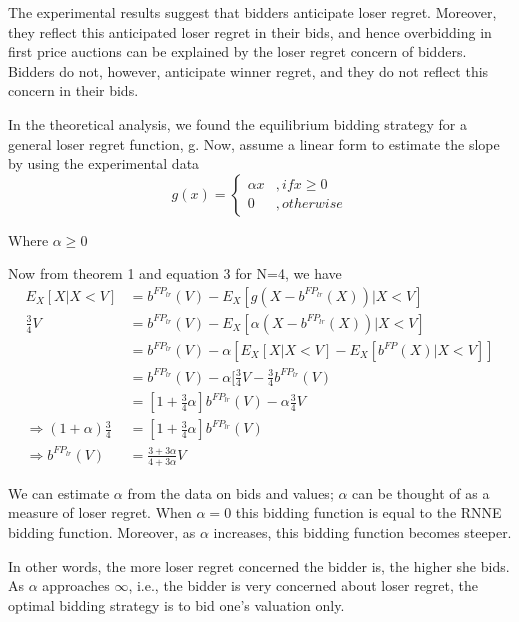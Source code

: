 \documentclass[10pt,a4paper,oneside]{report}
\begin{document}
\noindent The experimental results suggest that bidders anticipate loser regret. Moreover, they reflect this anticipated loser regret in their bids, and hence overbidding in first price auctions can be explained by the loser regret concern of bidders. Bidders do not, however, anticipate winner regret, and they do not reflect this concern in their bids.

\noindent In the theoretical analysis, we found the equilibrium bidding strategy for a general loser regret function, g. Now, assume a linear form to estimate the slope by using the experimental data\citep{bell1982regret}
\begin{equation}
g(x)=
\begin{cases}
\alpha x &,if x\geq 0 
\\
0 &, otherwise
\end{cases}
\end{equation}
\begin{flushleft}
Where $\alpha \geq 0$
\end{flushleft}

Now from theorem 1 and equation 3 for N=4, we have
\begin{align}
\nonumber
E_X[X|X<V] &= b^{{FP}_{lr}}(V)- E_X[g(X-b^{{FP}_{lr}}(X))|X<V]\\
\nonumber
\frac{3}{4}{V} &= b^{{FP}_{lr}}(V)-E_X[\alpha(X-b^{{FP}_{lr}}(X))|X<V]\\
\nonumber
      &= b^{{FP}_{lr}}(V)-\alpha [E_X[X|X<V]-E_X[b^{FP}(X)|X<V]]\\
      \nonumber
      &= b^{{FP}_{lr}}(V)-\alpha[\frac{3}{4}{V}-\frac{3}{4}{b^{{FP}_{lr}}(V)}\\
      \nonumber
      &= [1+\frac{3}{4}{\alpha}]b^{{FP}_{lr}}(V)-\alpha\frac{3}{4}{V} \\
      \nonumber
  \Rightarrow (1+\alpha)\frac{3}{4}&= [1+\frac{3}{4}{\alpha}]b^{{FP}_{lr}}(V)\\
  \Rightarrow b^{{FP}_{lr}}(V)&= \frac{3+3{\alpha}}{4+3{\alpha}}{V}
\end{align}


\noindent We can estimate $\alpha$ from the data on bids and values; $\alpha$ can be thought of as a measure of loser regret. When $\alpha = 0$ this bidding function is equal to the RNNE bidding function. Moreover, as $\alpha$ increases, this bidding function becomes steeper.

\noindent In other words, the more loser regret concerned the bidder is, the higher she bids. As $\alpha$ approaches $\infty$, i.e., the bidder is very concerned about loser regret, the optimal bidding strategy is to bid one’s valuation only.
\end{document}
